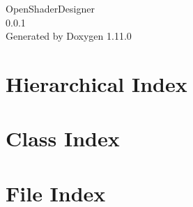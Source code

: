 \documentclass[twoside]{book}
\newcommand{\+}{\discretionary{\mbox{\scriptsize$\hookleftarrow$}}{}{}}
\newcommand{\clearemptydoublepage}{%
    \newpage{\pagestyle{empty}\cleardoublepage}%
  }
\begin{document}
  \raggedbottom
    \hypersetup{pageanchor=false,
                bookmarksnumbered=true,
                pdfencoding=unicode
               }
  \begin{titlepage}
  \vspace*{7cm}
  \begin{center}%
  {\Large Open\+Shader\+Designer}\\
  [1ex]\large 0.\+0.\+1 \\
  \vspace*{1cm}
  {\large Generated by Doxygen 1.11.0}\\
  \end{center}
  \end{titlepage}
  \clearemptydoublepage
  \tableofcontents
  \clearemptydoublepage
  \hypersetup{pageanchor=true}

\chapter{Hierarchical Index}

\chapter{Class Index}

\chapter{File Index}

\end{document}

